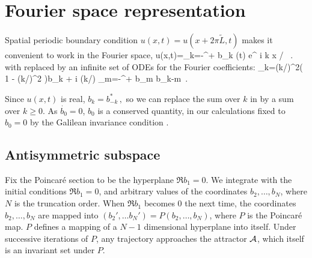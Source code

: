 \section{Fourier space representation} 
\label{s:FourierModes}



\noindent
Spatial periodic boundary condition $u(x,t)=u(x+2\pi\tilde{L},t)$
makes it convenient to work in the Fourier space, 
\beq
  u(x,t)=\sum_{k=-\infty}^{+\infty} b_k (t) e^{ i k x / }
\, .
with  replaced by an infinite set of 
ODEs for the Fourier coefficients:
\beq
_k=(k/)^2\left( 1 - (k/)^2  \right)b_k 
 	 + i (k/) \sum_{m=-\infty}^{+\infty} b_m b_{k-m}
\,.
%


Since $u(x,t)$ is real,
$ %
b_k=b_{-k}^*
\,,
$ %
so we can replace the sum over $k$ in  by a
sum over $k \geq 0$.
As  $\dot{b_0}=0$, $b_0$ is a conserved quantity,
in our calculations
fixed to $b_0=0$ by
the Galilean invariance condition .


\subsection{Antisymmetric subspace} 
\label{s:AntisymmSubsp}

Fix the  Poincar\'e section to be the hyperplane
$\Re b_1=0$. We integrate  with the initial
 conditions
$\Re b_1=0$, and arbitrary values of the coordinates  $b_2, \ldots, b_N$, where
$N$ is the truncation order.  When $\Re b_1$ becomes
$0$ the next time,  the coordinates  $b_2, \ldots, b_N$ are mapped
into $(b_2', \ldots b_N')=P(b_2, \ldots, b_N)$, where $P$ is the  Poincar\'e
map. $P$ defines a mapping of a $N-1$ dimensional hyperplane into itself.
Under successive iterations of  $P$, any trajectory
approaches the attractor ${\cal A}$, which itself is an invariant
set under $P$.


